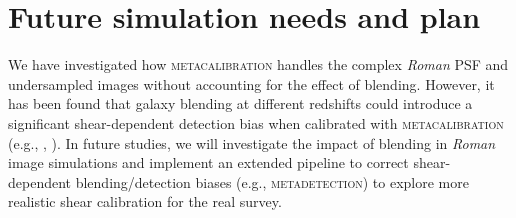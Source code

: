 \documentclass[fleqn,usenatbib]{mnras}
\begin{document}


\section{Future simulation needs and plan}
\label{sec:discussion}

We have investigated how \textsc{metacalibration} handles the complex \emph{Roman} PSF and undersampled images without accounting for the effect of blending. However, it has been found that galaxy blending at different redshifts could introduce a significant shear-dependent detection bias when calibrated with \textsc{metacalibration} (e.g., \citealt{2020ApJ...902..138S}, \citealt{2020arXiv201208567M}). In future studies, we will investigate the impact of blending in \emph{Roman} image simulations and implement an extended pipeline to correct shear-dependent blending/detection biases (e.g.,  \textsc{metadetection}) to explore more realistic shear calibration for the real survey. 
\end{document}
